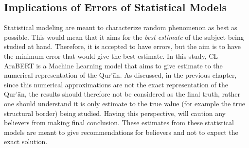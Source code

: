 \subsection{Implications of Errors of Statistical Models}
Statistical modeling are meant to characterize random phenomenon as best as possible. This would mean that it aims for the \textit{best estimate} of the subject being studied at hand. Therefore, it is accepted to have errors, but the aim is to have the minimum error that would give the best estimate. In this study, CL-AraBERT is a Machine Learning model that aims to give estimate to the numerical representation of the Qur'\=an. As discussed, in the previous chapter, since this numerical approximations are not the exact representation of the Qur'\=an, the results should therefore not be considered as the final truth, rather one should understand it is only estimate to the true value (for example the true structural border) being studied. Having this perspective, will caution any believers from making final conclusion. These estimates from these statistical models are meant to give recommendations for believers and not to expect the exact solution.
